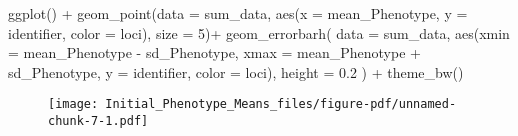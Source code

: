 \documentclass[
  letterpaper,
  DIV=11,
  numbers=noendperiod]{scrartcl}
\newenvironment{Shaded}{\begin{snugshade}}{\end{snugshade}}
\newcommand{\AttributeTok}[1]{\textcolor[rgb]{0.40,0.46,0.14}{#1}}
\newcommand{\DecValTok}[1]{\textcolor[rgb]{0.68,0.00,0.00}{#1}}
\newcommand{\FloatTok}[1]{\textcolor[rgb]{0.68,0.00,0.00}{#1}}
\newcommand{\FunctionTok}[1]{\textcolor[rgb]{0.28,0.35,0.67}{#1}}
\newcommand{\NormalTok}[1]{\textcolor[rgb]{0.00,0.46,0.62}{#1}}
\newcommand{\SpecialCharTok}[1]{\textcolor[rgb]{0.37,0.37,0.37}{#1}}
\begin{document}
\begin{Shaded}
\begin{Highlighting}[]
\FunctionTok{ggplot}\NormalTok{() }\SpecialCharTok{+}
  \FunctionTok{geom\_point}\NormalTok{(}\AttributeTok{data =}\NormalTok{ sum\_data, }\FunctionTok{aes}\NormalTok{(}\AttributeTok{x =}\NormalTok{ mean\_Phenotype, }\AttributeTok{y =}\NormalTok{ identifier, }\AttributeTok{color =}\NormalTok{ loci), }\AttributeTok{size =} \DecValTok{5}\NormalTok{)}\SpecialCharTok{+}
  \FunctionTok{geom\_errorbarh}\NormalTok{(}
    \AttributeTok{data =}\NormalTok{ sum\_data,}
    \FunctionTok{aes}\NormalTok{(}\AttributeTok{xmin =}\NormalTok{ mean\_Phenotype }\SpecialCharTok{{-}}\NormalTok{ sd\_Phenotype, }\AttributeTok{xmax =}\NormalTok{ mean\_Phenotype }\SpecialCharTok{+}\NormalTok{ sd\_Phenotype, }\AttributeTok{y =}\NormalTok{ identifier, }\AttributeTok{color =}\NormalTok{ loci),}
    \AttributeTok{height =} \FloatTok{0.2}
\NormalTok{  )  }\SpecialCharTok{+}
  \FunctionTok{theme\_bw}\NormalTok{()}
\end{Highlighting}
\end{Shaded}

\begin{figure}[H]

{\centering \texttt{[image: Initial\_Phenotype\_Means\_files/figure-pdf/unnamed-chunk-7-1.pdf]}

}

\end{figure}
\end{document}
